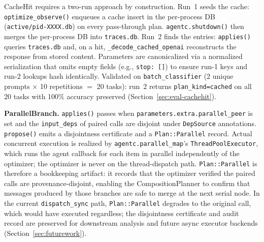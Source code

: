 CacheHit requires a two-run approach by construction. Run~1 seeds the cache:
\texttt{optimize\_observe()} enqueues a cache insert in the per-process DB
(\texttt{active/pid-XXXX.db}) on every pass-through plan. \texttt{agentc.shutdown()}
then merges the per-process DB into \texttt{traces.db}. Run~2 finds the entries:
\texttt{applies()} queries \texttt{traces.db} and, on a hit, \texttt{\_decode\_cached\_openai}
reconstructs the response from stored content. Parameters are canonicalized via a
normalized serialization that omits empty fields (e.g., \texttt{stop:~[]}) to
ensure run-1 keys and run-2 lookups hash identically. Validated on
\texttt{batch\_classifier} (2 unique prompts $\times$ 10 repetitions $=$ 20 tasks):
run~2 returns \texttt{plan\_kind=cached} on all 20 tasks with 100\% accuracy
preserved (Section~\ref{sec:eval-cachehit}).

\textbf{ParallelBranch.} \texttt{applies()} passes when
\texttt{parameters.extra.\allowbreak parallel\_peer} is set and the
\texttt{input\_deps} of paired calls are disjoint under \texttt{DepSource}
annotations. \texttt{propose()} emits a disjointness certificate and a
\texttt{Plan::Parallel} record. Actual concurrent execution is realized by
\texttt{agentc.parallel\_map}'s \texttt{ThreadPoolExecutor}, which runs the agent
callback for each item in parallel independently of the optimizer; the optimizer
is never on the thread-dispatch path. \texttt{Plan::Parallel} is therefore a
bookkeeping artifact: it records that the optimizer verified the paired calls are
provenance-disjoint, enabling the CompositionPlanner to confirm that messages
produced by those branches are safe to merge at the next serial node. In the
current \texttt{dispatch\_sync} path, \texttt{Plan::Parallel} degrades to the
original call, which would have executed regardless; the disjointness certificate
and audit record are preserved for downstream analysis and future async executor
backends (Section~\ref{sec:futurework}).

